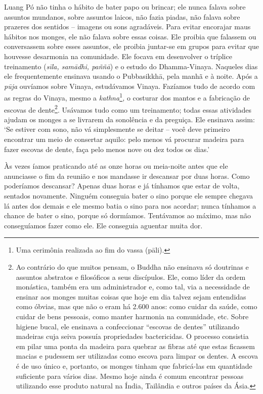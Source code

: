 Luang Pó não tinha o hábito de bater papo ou brincar; ele nunca falava
sobre assuntos mundanos, sobre assuntos laicos, não fazia piadas, não
falava sobre prazeres dos sentidos -- imagens ou sons agradáveis. Para
evitar encorajar maus hábitos nos monges, ele não falava sobre essas
coisas. Ele proibia que falassem ou conversassem sobre esses assuntos,
ele proibia juntar-se em grupos para evitar que houvesse desarmonia na
comunidade. Ele focava em desenvolver o tríplice treinamento
(\emph{sīla, samādhi, paññā}) e o estudo do Dhamma-Vinaya. Naqueles dias
ele frequentemente ensinava usando o Pubbasikkhā, pela manhã e à noite.
Após a \emph{pūja} ouvíamos sobre Vinaya, estudávamos Vinaya. Fazíamos
tudo de acordo com as regras do Vinaya, mesmo a \emph{kathna}\footnote{Uma
  cerimônia realizada ao fim do vassa (pāli).}\emph{,} o costurar dos
mantos e a fabricação de escovas de dente\footnote{Ao contrário do que
  muitos pensam, o Buddha não ensinava só doutrinas e assuntos abstratos
  e filosóficos a seus discípulos. Ele, como líder da ordem monástica,
  também era um administrador e, como tal, via a necessidade de ensinar
  aos monges muitas coisas que hoje em dia talvez sejam entendidas como
  óbvias, mas que não o eram há 2.600 anos: como cuidar da saúde, como
  cuidar de bens pessoais, como manter harmonia na comunidade, etc.
  Sobre higiene bucal, ele ensinava a confeccionar ``escovas de dentes''
  utilizando madeiras cuja seiva possuía propriedades bactericidas. O
  processo consistia em pilar uma ponta da madeira para quebrar as
  fibras até que estas ficassem macias e pudessem ser utilizadas como
  escova para limpar os dentes. A escova é de uso único e, portanto, os
  monges tinham que fabricá-las em quantidade suficiente para vários
  dias. Mesmo hoje ainda é comum encontrar pessoas utilizando esse
  produto natural na Índia, Tailândia e outros países da Ásia.}.
Usávamos tudo como um treinamento; todas essas atividades ajudam os
monges a se livrarem da sonolência e da preguiça. Ele ensinava assim:
`Se estiver com sono, não vá simplesmente se deitar -- você deve
primeiro encontrar um meio de consertar aquilo: pelo menos vá procurar
madeira para fazer escovas de dente, faça pelo menos nove ou dez todos
os dias.'

Às vezes íamos praticando até as onze horas ou meia-noite antes que ele
anunciasse o fim da reunião e nos mandasse ir descansar por duas horas.
Como poderíamos descansar? Apenas duas horas e já tínhamos que estar de
volta, sentados novamente. Ninguém conseguia bater o sino porque ele
sempre chegava lá antes dos demais e ele mesmo batia o sino para nos
acordar; nunca tínhamos a chance de bater o sino, porque só dormíamos.
Tentávamos ao máximo, mas não conseguíamos fazer como ele. Ele conseguia
aguentar muita dor.


